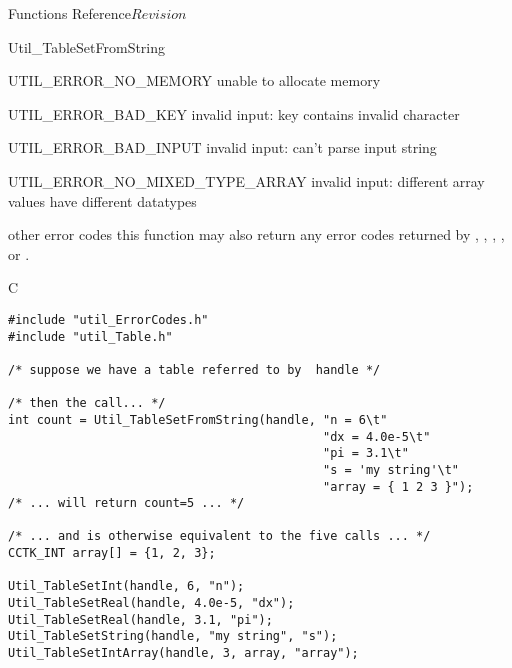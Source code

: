 \begin{cactuspart}{ Functions Reference}{}{$Revision$}
\begin{FunctionDescription}{Util\_TableSetFromString}
\begin{ErrorSection}
\begin{Error}{UTIL\_ERROR\_NO\_MEMORY}
unable to allocate memory
\end{Error}
\begin{Error}{UTIL\_ERROR\_BAD\_KEY}
invalid input: key contains invalid character
\end{Error}
\begin{Error}{UTIL\_ERROR\_BAD\_INPUT}
invalid input: can't parse input string
\end{Error}
\begin{Error}{UTIL\_ERROR\_NO\_MIXED\_TYPE\_ARRAY}
invalid input: different array values have different datatypes
\end{Error}
\begin{Error}{\rm other error codes}
this function may also return any error codes returned by
, ,
, ,
or .
\end{Error}
\end{ErrorSection}

\begin{ExampleSection}
\begin{Example}{C}
\begin{verbatim}
#include "util_ErrorCodes.h"
#include "util_Table.h"

/* suppose we have a table referred to by  handle */

/* then the call... */
int count = Util_TableSetFromString(handle, "n = 6\t"
                                            "dx = 4.0e-5\t"
                                            "pi = 3.1\t"
                                            "s = 'my string'\t"
                                            "array = { 1 2 3 }");
/* ... will return count=5 ... */

/* ... and is otherwise equivalent to the five calls ... */
CCTK_INT array[] = {1, 2, 3};

Util_TableSetInt(handle, 6, "n");
Util_TableSetReal(handle, 4.0e-5, "dx");
Util_TableSetReal(handle, 3.1, "pi");
Util_TableSetString(handle, "my string", "s");
Util_TableSetIntArray(handle, 3, array, "array");
\end{verbatim}
\end{Example}
\end{ExampleSection}
\end{FunctionDescription}



\end{cactuspart}
